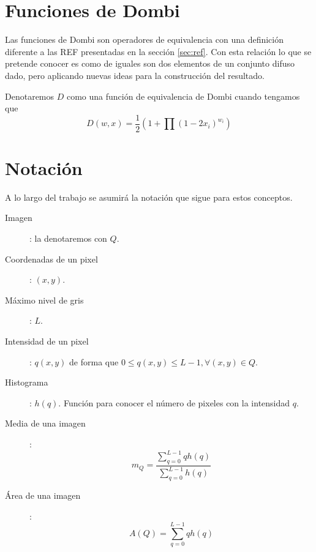 \section{Funciones de Dombi}\label{sec:dombi}
Las funciones de Dombi \cite{art:dombi} son operadores de equivalencia con una definición diferente a las REF presentadas en la sección \ref{sec:ref}. Con esta relación lo que se pretende conocer es como de iguales son dos elementos de un conjunto difuso dado, pero aplicando nuevas ideas para la construcción del resultado. 
\begin{definition}\label{def:dombi}
Denotaremos $D$ como una función de equivalencia de Dombi cuando tengamos que 
$$D(w,x)=\frac{1}{2}\left(1+\prod(1-2x_{i})^{w_{i}}\right)$$
\end{definition}




\section{Notación}\label{sec:notacion}

A lo largo del trabajo se asumirá la notación que sigue para estos conceptos.

\begin{description}
    \item[Imagen]: la denotaremos con $Q$.
    \item[Coordenadas de un pixel]: $(x,y)$.
    \item[Máximo nivel de gris]: $L$.
    \item[Intensidad de un pixel]: $q(x,y)$ de forma que $0\leq q(x,y)\leq L-1, \forall (x,y)\in Q$.  
    \item[Histograma]: $h(q)$. Función para conocer el número de pixeles con la intensidad $q$. 
    \item[Media de una imagen]:$$m_Q=\frac{\sum_{q=0}^{L-1}qh(q)}{\sum_{q=0}^{L-1}h(q)}$$
    \item[Área de una imagen]: $$A(Q) = \sum_{q=0}^{L-1} q h(q)$$
\end{description}























